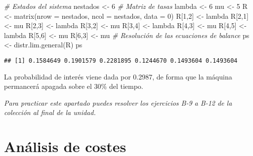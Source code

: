 \documentclass[
]{book}
\newenvironment{Shaded}{\begin{snugshade}}{\end{snugshade}}
\newcommand{\AttributeTok}[1]{\textcolor[rgb]{0.77,0.63,0.00}{#1}}
\newcommand{\CommentTok}[1]{\textcolor[rgb]{0.56,0.35,0.01}{\textit{#1}}}
\newcommand{\DecValTok}[1]{\textcolor[rgb]{0.00,0.00,0.81}{#1}}
\newcommand{\FunctionTok}[1]{\textcolor[rgb]{0.00,0.00,0.00}{#1}}
\newcommand{\NormalTok}[1]{#1}
\newcommand{\OtherTok}[1]{\textcolor[rgb]{0.56,0.35,0.01}{#1}}
\theoremstyle{definition}
\theoremstyle{definition}
\theoremstyle{definition}
\theoremstyle{definition}
\theoremstyle{remark}
\begin{document}
\begin{Shaded}
\begin{Highlighting}[]
\CommentTok{\# Estados del sistema}
\NormalTok{nestados }\OtherTok{\textless{}{-}} \DecValTok{6}
\CommentTok{\# Matriz de tasas}
\NormalTok{lambda }\OtherTok{\textless{}{-}} \DecValTok{6}
\NormalTok{mu }\OtherTok{\textless{}{-}} \DecValTok{5}
\NormalTok{R }\OtherTok{\textless{}{-}} \FunctionTok{matrix}\NormalTok{(}\AttributeTok{nrow =}\NormalTok{ nestados, }\AttributeTok{ncol =}\NormalTok{ nestados, }\AttributeTok{data =} \DecValTok{0}\NormalTok{)}
\NormalTok{R[}\DecValTok{1}\NormalTok{,}\DecValTok{2}\NormalTok{] }\OtherTok{\textless{}{-}}\NormalTok{ lambda }
\NormalTok{R[}\DecValTok{2}\NormalTok{,}\DecValTok{1}\NormalTok{] }\OtherTok{\textless{}{-}}\NormalTok{ mu}
\NormalTok{R[}\DecValTok{2}\NormalTok{,}\DecValTok{3}\NormalTok{] }\OtherTok{\textless{}{-}}\NormalTok{ lambda }
\NormalTok{R[}\DecValTok{3}\NormalTok{,}\DecValTok{2}\NormalTok{] }\OtherTok{\textless{}{-}}\NormalTok{ mu}
\NormalTok{R[}\DecValTok{3}\NormalTok{,}\DecValTok{4}\NormalTok{] }\OtherTok{\textless{}{-}}\NormalTok{ lambda}
\NormalTok{R[}\DecValTok{4}\NormalTok{,}\DecValTok{3}\NormalTok{] }\OtherTok{\textless{}{-}}\NormalTok{ mu}
\NormalTok{R[}\DecValTok{4}\NormalTok{,}\DecValTok{5}\NormalTok{] }\OtherTok{\textless{}{-}}\NormalTok{ lambda}
\NormalTok{R[}\DecValTok{5}\NormalTok{,}\DecValTok{6}\NormalTok{] }\OtherTok{\textless{}{-}}\NormalTok{ mu}
\NormalTok{R[}\DecValTok{6}\NormalTok{,}\DecValTok{3}\NormalTok{] }\OtherTok{\textless{}{-}}\NormalTok{ mu}
\CommentTok{\# Resolución  de las ecuaciones de balance}
\NormalTok{ps }\OtherTok{\textless{}{-}} \FunctionTok{distr.lim.general}\NormalTok{(R)}
\NormalTok{ps}
\end{Highlighting}
\end{Shaded}

\begin{verbatim}
## [1] 0.1584649 0.1901579 0.2281895 0.1244670 0.1493604 0.1493604
\end{verbatim}

La probabilidad de interés viene dada por 0.2987, de forma que la máquina permancerá apagada sobre el 30\% del tiempo.

\emph{Para practicar este apartado puedes resolver los ejercicios B-9 a B-12 de la colección al final de la unidad.}

\hypertarget{CMTCI}{%
\section{Análisis de costes}\label{CMTCI}}
\end{document}

